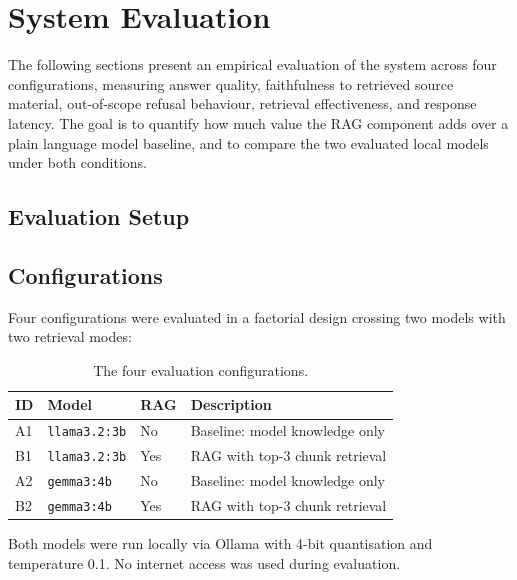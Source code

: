 \section{System Evaluation}
\label{sec:testing-system}

The following sections present an empirical evaluation of the system across four configurations, measuring answer quality, faithfulness to retrieved source material, out-of-scope refusal behaviour, retrieval effectiveness, and response latency. The goal is to quantify how much value the RAG component adds over a plain language model baseline, and to compare the two evaluated local models under both conditions.

\subsection{Evaluation Setup}
\label{sec:eval-setup}

\subsection{Configurations}

Four configurations were evaluated in a factorial design crossing two models with two retrieval modes:

\begin{table}[H]
    \centering
    \begin{tabular}{|l|l|l|l|}
        \hline
        \textbf{ID} & \textbf{Model} & \textbf{RAG} & \textbf{Description} \\
        \hline\hline
        A1 & \texttt{llama3.2:3b} & No  & Baseline: model knowledge only \\
        B1 & \texttt{llama3.2:3b} & Yes & RAG with top-3 chunk retrieval \\
        A2 & \texttt{gemma3:4b}   & No  & Baseline: model knowledge only \\
        B2 & \texttt{gemma3:4b}   & Yes & RAG with top-3 chunk retrieval \\
        \hline
    \end{tabular}
    \caption{The four evaluation configurations.}
    \label{tab:eval-configs}
\end{table}

Both models were run locally via Ollama with 4-bit quantisation and temperature 0.1. No internet access was used during evaluation.

